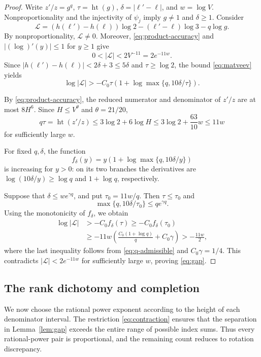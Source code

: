 \documentclass[11pt,reqno]{amsart}
\theoremstyle{definition}
\theoremstyle{plain}
\theoremstyle{definition}
\theoremstyle{remark}
\newcommand{\htq}{\operatorname{ht}}
\begin{document}
\begin{proof}
Write $z'/z=g^q$, $\tau=\htq(g)$,
$\delta=|\ell'-\ell|$, and $w=\log V$.
Nonproportionality and the injectivity of
$\psi_j$ imply $g\ne1$ and $\delta\ge1$.
Consider
\[
 \mathcal L=
 (h(\ell')-h(\ell))\log2
 -(\ell'-\ell)\log3-q\log g.
\]
By nonproportionality, $\mathcal L\ne0$.
Moreover, \eqref{eq:product-accuracy} and
$|(\log)'(y)|\le1$ for $y\ge1$ give
\[
 0<|\mathcal L|<2V^{-11}=2e^{-11w}.
\]
Since $|h(\ell')-h(\ell)|<2\delta+3\le5\delta$
and $\tau\ge\log2$, the bound
\eqref{eq:matveev} yields
\[
 \log|\mathcal L|>
 -C_0\tau\left(
 1+\log\max\{q,10\delta/\tau\}\right).
\]

By \eqref{eq:product-accuracy}, the reduced
numerator and denominator of $z'/z$ are at
most $8H^6$. Since $H\le V^\theta$
and $\theta=21/20$,
\[
 q\tau=\htq(z'/z)
 \le3\log2+6\log H
 \le3\log2+\frac{63}{10}w
 \le11w
\]
for sufficiently large $w$.

For fixed $q,\delta$, the function
\[
 f_\delta(y)=y\left(
 1+\log\max\{q,10\delta/y\}\right)
\]
is increasing for $y>0$: on its two
branches the derivatives are
$\log(10\delta/y)\ge\log q$ and
$1+\log q$, respectively.

Suppose that $\delta\le we^{\gamma q}$,
and put $\tau_0=11w/q$. Then
$\tau\le\tau_0$ and
\[
 \max\{q,10\delta/\tau_0\}
 \le qe^{\gamma q}.
\]
Using the monotonicity of $f_\delta$,
we obtain
\[
 \begin{aligned}
 \log|\mathcal L|
 &>-C_0f_\delta(\tau)
 \ge-C_0f_\delta(\tau_0)\\
 &\ge-11w\left(
 \frac{C_0(1+\log q)}q+C_0\gamma\right)
 >-\frac{11w}{2},
 \end{aligned}
\]
where the last inequality follows from
\eqref{eq:q-admissible} and $C_0\gamma=1/4$.
This contradicts $|\mathcal L|<2e^{-11w}$
for sufficiently large $w$, proving
\eqref{eq:gap}.
\end{proof}


\subsection{The rank dichotomy and completion}
\label{sec:adaptive}

We now choose the rational power exponent according to the
height of each denominator interval. The restriction
\eqref{eq:contraction} ensures that the separation in
Lemma~\ref{lem:gap} exceeds the entire range of possible
index sums. Thus every rational-power pair is proportional,
and the remaining count reduces to rotation discrepancy.
\end{document}
